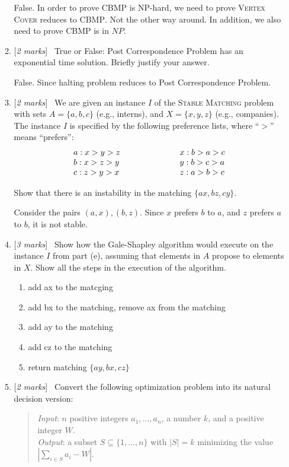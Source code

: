 \documentclass[11pt]{article}
\newcommand{\Q}[1]{\medskip\item {[{\em #1 marks\/}]}\ }
\begin{document}
\begin{enumerate}
\begin{enumerate}
False. In order to prove \textsc{CBMP} is NP-hard, 
we need to prove \textsc{Vertex Cover} reduces to \textsc{CBMP}. Not the other way around.
In addition, we also need to prove \textsc{CBMP} is in $NP$.

\newpage
\Q{2} True or False: Post Correspondence Problem has an exponential time solution. Briefly justify your answer.

False. Since halting problem reduces to Post Correspondence Problem.

\newpage
\Q{2} We are given an instance $I$ of the \textsc{Stable Matching} problem with
sets  $A = \{a,b,c\}$ (e.g., interns), and $X = \{x,y,z\}$ (e.g., companies).
The instance $I$ is specified by the following preference lists, where
``$>$'' means ``prefers'':
\[
\begin{array}{l@{\hspace{1in}}l}
a : x > y > z & x : b > a > c\\
b : x > z > y & y : b > c > a\\
c : z > y > x & z : a > b > c
\end{array}
\]

Show that there is an instability in the matching
$\{ ax,bz,cy\}$. 
 
Consider the pairs $(a, x), (b ,z)$. Since $x$ prefers $b$ to $a$, and $z$ prefers $a$ to $b$, it is not stable.

\newpage
\Q{3} Show how the Gale-Shapley algorithm would execute on the instance $I$ from part (e), assuming that 
elements in $A$ propose to elements in $X$. Show all the steps in the execution of the algorithm.

\begin{enumerate}[label={\arabic*.}]
    \item add ax to the matcging 
    \item add bx to the matching, remove ax from the matching
    \item add ay to the matching
    \item add cz to the matching
    \item return matching $\{ay, bx, cz\}$
\end{enumerate}

\newpage
\Q{2} Convert the following optimization problem into its natural decision version:
\begin{quote}
{\em Input\/}: $n$ positive integers $a_1,\ldots, a_n$, a number $k$, and a positive integer $W$.\\[2pt]
{\em Output\/}: a subset $S\subseteq \{1,\ldots,n\}$ with $|S|=k$
minimizing the value $\left|\sum_{i\in S} a_i - W\right|$.  
\end{quote}


\end{enumerate}
\end{enumerate}
\end{document}

